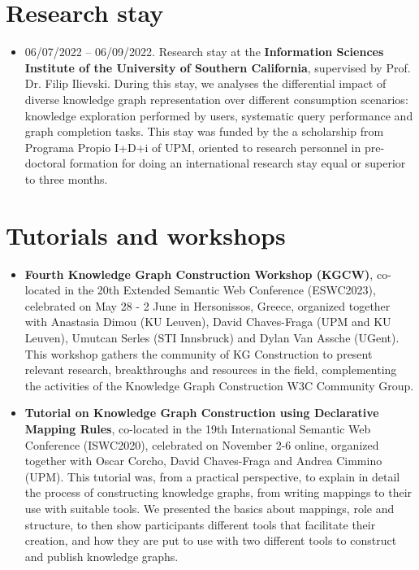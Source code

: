 \section{Research stay}
\begin{itemize}
    \item 06/07/2022 -- 06/09/2022. Research stay at the \textbf{Information Sciences Institute of the University of Southern California}, supervised by Prof. Dr. Filip Ilievski. During this stay, we analyses the differential impact of diverse knowledge graph representation over different consumption scenarios: knowledge exploration performed by users, systematic query performance and graph completion tasks. This stay was funded by the a scholarship from Programa Propio I+D+i of UPM, oriented to research personnel in pre-doctoral formation for doing an international research stay equal or superior to three months.
\end{itemize}

\section{Tutorials and workshops}
\begin{itemize}
    \item \textbf{Fourth Knowledge Graph Construction Workshop (KGCW)}, co-located in the 20th Extended Semantic Web Conference (ESWC2023), celebrated on May 28 - 2 June in Hersonissos, Greece, organized together with Anastasia Dimou (KU Leuven), David Chaves-Fraga (UPM and KU Leuven), Umutcan Serles (STI Innsbruck) and Dylan Van Assche (UGent). This workshop gathers the community of KG Construction to present relevant research, breakthroughs and resources in the field, complementing the activities of the Knowledge Graph Construction W3C Community Group. 

    \item \textbf{Tutorial on Knowledge Graph Construction using Declarative Mapping Rules}, co-located in the 19th International Semantic Web Conference (ISWC2020), celebrated on November 2-6 online, organized together with Oscar Corcho, David Chaves-Fraga and Andrea Cimmino (UPM). This tutorial was, from a practical perspective, to explain in detail the process of constructing knowledge graphs, from writing mappings to their use with suitable tools. We presented the basics about mappings, role and structure, to then show participants different tools that facilitate their creation, and how they are put to use with two different tools to construct and publish knowledge graphs. 
\end{itemize}

